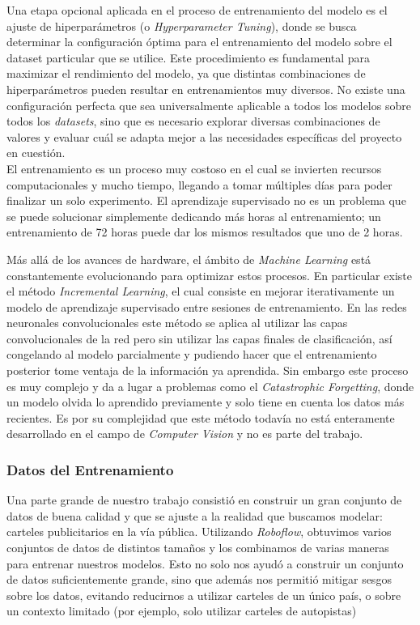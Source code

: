 \documentclass[a4paper]{article}
\begin{document}
Una etapa opcional aplicada en el proceso de entrenamiento del modelo es el ajuste de hiperparámetros (o \textit{Hyperparameter Tuning}), donde se busca determinar la configuración óptima para el entrenamiento del modelo sobre el dataset particular que se utilice. Este procedimiento es fundamental para maximizar el rendimiento del modelo, ya que distintas combinaciones de hiperparámetros pueden resultar en entrenamientos muy diversos. No existe una configuración perfecta que sea universalmente aplicable a todos los modelos sobre todos los \textit{datasets}, sino que es necesario explorar diversas combinaciones de valores y evaluar cuál se adapta mejor a las necesidades específicas del proyecto en cuestión.\\

El entrenamiento es un proceso muy costoso en el cual se invierten recursos computacionales y mucho tiempo, llegando a tomar múltiples días para poder finalizar un solo experimento. El aprendizaje supervisado no es un problema que se puede solucionar simplemente dedicando más horas al entrenamiento; un entrenamiento de 72 horas puede dar los mismos resultados que uno de 2 horas.

Más allá de los avances de hardware, el ámbito de \textit{Machine Learning} está constantemente evolucionando para optimizar estos procesos. En particular existe el método \textit{Incremental Learning}, el cual consiste en mejorar iterativamente un modelo de aprendizaje supervisado entre sesiones de entrenamiento. En las redes neuronales convolucionales este método se aplica al utilizar las capas convolucionales de la red pero sin utilizar las capas finales de clasificación, así congelando al modelo parcialmente y pudiendo hacer que el entrenamiento posterior tome ventaja de la información ya aprendida. Sin embargo este proceso es muy complejo y da a lugar a problemas como el \textit{Catastrophic Forgetting}, donde un modelo olvida lo aprendido previamente y solo tiene en cuenta los datos más recientes. Es por su complejidad que este método todavía no está enteramente desarrollado en el campo de \textit{Computer Vision} y no es parte del trabajo.

\subsubsection{Datos del Entrenamiento}

Una parte grande de nuestro trabajo consistió en construir un gran conjunto de datos de buena calidad y que se ajuste a la realidad que buscamos modelar: carteles publicitarios en la vía pública. Utilizando \textit{Roboflow}, obtuvimos varios conjuntos de datos de distintos tamaños y los combinamos de varias maneras para entrenar nuestros modelos. Esto no solo nos ayudó a construir un conjunto de datos suficientemente grande, sino que además nos permitió mitigar sesgos sobre los datos, evitando reducirnos a utilizar carteles de un único país, o sobre un contexto limitado (por ejemplo, solo utilizar carteles de autopistas)
\end{document}
